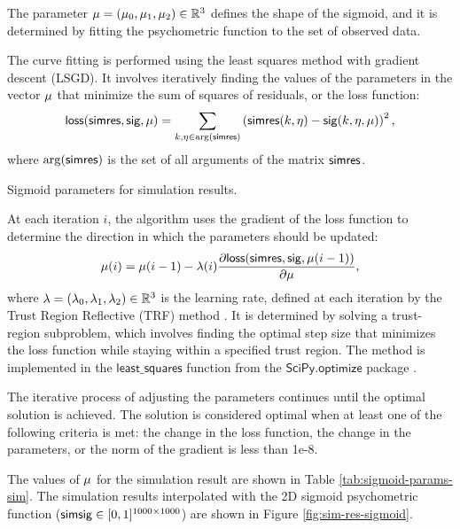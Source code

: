 The parameter $\mu = (\mu_0, \mu_1, \mu_2) \in \mathbb{R}^3$ defines the shape of the sigmoid, and it is determined by fitting the psychometric function to the set of observed data. 

The curve fitting is performed using the least squares method with gradient descent (LSGD). It involves iteratively finding the values of the parameters in the vector $\mu$ that minimize the sum of squares of residuals, or the loss function:
\begin{equation}
    \mathsf{loss}(\mathsf{simres}, \mathsf{sig}, \mu) = \sum_{k, \eta \in \arg (\mathsf{simres})} 
    \left(
        \mathsf{simres}(k, \eta) - \mathsf{sig}(k, \eta, \mu)
    \right)^2,
\end{equation}
where $\arg (\mathsf{simres})$ is the set of all arguments of the matrix $\mathsf{simres}$.

\begin{table}[b]
    \centering
    
    \caption[Sigmoid parameters for simulation results]{Sigmoid parameters for simulation results.}
    \label{tab:sigmoid-params-sim}
\end{table}

At each iteration $i$, the algorithm uses the gradient of the loss function to determine the direction in which the parameters should be updated:
\begin{equation}
    \mu(i) = \mu(i-1) - \lambda(i)
    \frac{
        \partial \mathsf{loss}(\mathsf{simres}, \mathsf{sig}, \mu(i-1))
    }{
        \partial {\mu}
    },
\end{equation}
where $\lambda = (\lambda_0, \lambda_1, \lambda_2) \in \mathbb{R}^3$ is the learning rate, defined at each iteration by the Trust Region Reflective (TRF) method \cite{Branch1999}. It is determined by solving a trust-region subproblem, which involves finding the optimal step size that minimizes the loss function while staying within a specified trust region. The method is implemented in the $\mathsf{least\_squares}$ function from the $\mathsf{SciPy.optimize}$ package \cite{SciPy:least_squares}. 

The iterative process of adjusting the parameters continues until the optimal solution is achieved. The solution is considered optimal when at least one of the following criteria is met: the change in the loss function, the change in the parameters, or the norm of the gradient is less than 1e-8.

The values of $\mu$ for the simulation result are shown in Table \ref{tab:sigmoid-params-sim}.
The simulation results interpolated with the 2D sigmoid psychometric function ($\mathsf{simsig} \in [0, 1]^{1000 \times 1000}$) are shown in Figure \ref{fig:sim-res-sigmoid}.
